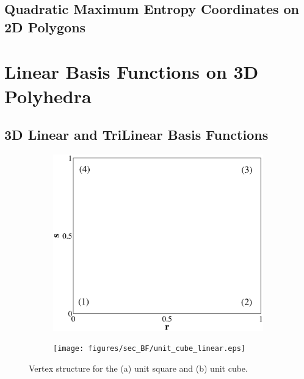 \subsection{Quadratic Maximum Entropy Coordinates on 2D Polygons}
\label{sec::BF_2DQuadratic_ME}



\section{Linear Basis Functions on 3D Polyhedra}
\label{sec::BF_3DLinear}



\subsection{3D Linear and TriLinear Basis Functions}
\label{sec::BF_3DLinear_TriL}

\begin{figure}
\centering
	\begin{subfigure}[b]{0.45\textwidth}
		\centering
		\label{subfig::unit_square}
		\includegraphics[width=\textwidth]{figures/sec_BF/unit_square_linear.eps}
		\caption{}
	\end{subfigure}
	\hfill
	\begin{subfigure}[b]{0.45\textwidth}
		\centering
		\label{subfig::unit_cube}
		\texttt{[image: figures/sec\_BF/unit\_cube\_linear.eps]}
		\caption{}
	\end{subfigure}
\caption{Vertex structure for the (a) unit square and (b) unit cube.}
\label{fig::BF_3D_unit_tet_cube}
\end{figure}

